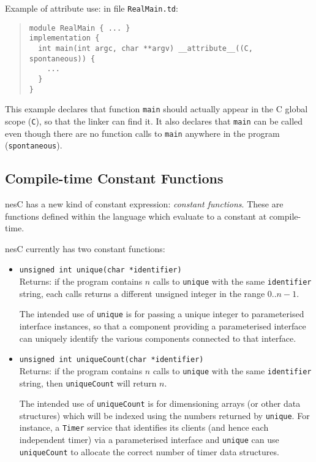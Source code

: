 \documentclass[11pt,letterpaper]{article}
\newcommand{\kw}[1]{{\tt #1}}
\newcommand{\code}[1]{{\tt #1}}
\newcommand{\file}[1]{{\tt #1}}
\newcommand{\nesc}{nesC\xspace}
\begin{document}
Example of attribute use: in file \file{RealMain.td}:
\begin{quote} \begin{verbatim}
module RealMain { ... }
implementation {
  int main(int argc, char **argv) __attribute__((C, spontaneous)) {
    ...
  }
}
\end{verbatim} \end{quote}

This example declares that function \code{main} should actually appear
in the C global scope (\code{C}), so that the linker can find it. It
also declares that \code{main} can be called even though there are no
function calls to \code{main} anywhere in the program
(\code{spontaneous}). 

\subsection{Compile-time Constant Functions}

\nesc has a new kind of constant expression: \emph{constant
functions}. These are functions defined within the language which
evaluate to a constant at compile-time.

\nesc currently has two constant functions:
\begin{itemize}
\item 
\code{unsigned int unique(char *identifier)} \\ Returns: if the program
contains $n$ calls to \code{unique} with the same \code{identifier}
string, each calls returns a different unsigned integer in the range
$0 .. n-1$.

The intended use of \code{unique} is for passing a unique integer
to parameterised interface instances, so that a component providing
a parameterised interface can uniquely identify the various components
connected to that interface.

\item \code{unsigned int uniqueCount(char *identifier)} \\ Returns: if the
program contains $n$ calls to \code{unique} with the same \code{identifier}
string, then \code{uniqueCount} will return $n$.

The intended use of \code{uniqueCount} is for dimensioning arrays (or other
data structures) which will be indexed using the numbers returned by
\kw{unique}. For instance, a \kw{Timer} service that identifies its clients
(and hence each independent timer) via a parameterised interface and
\kw{unique} can use \kw{uniqueCount} to allocate the correct number of
timer data structures.

\end{itemize}
\end{document}
